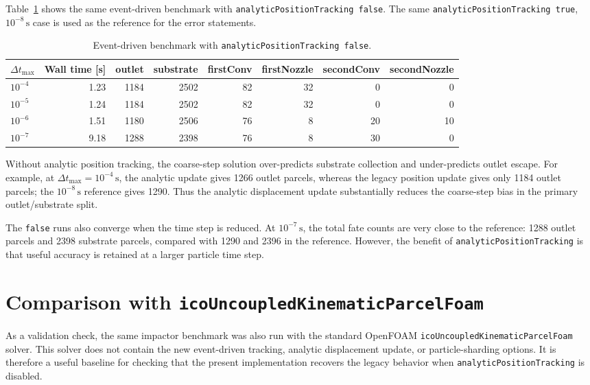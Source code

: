 \documentclass[11pt]{article}
\begin{document}
Table~\ref{tab:false-event} shows the same event-driven benchmark with
\texttt{analyticPositionTracking false}.  The same
\texttt{analyticPositionTracking true}, \(10^{-8}\,\mathrm{s}\) case is used as
the reference for the error statements.

\begin{table}[h]
\centering
\caption{Event-driven benchmark with \texttt{analyticPositionTracking false}.}
\label{tab:false-event}
\begin{tabular}{@{}lrrrrrrr@{}}
\toprule
\(\Delta t_{\max}\) & Wall time [s] & outlet & substrate & firstConv & firstNozzle & secondConv & secondNozzle \\
\midrule
\(10^{-4}\) & 1.23 & 1184 & 2502 & 82 & 32 & 0  & 0  \\
\(10^{-5}\) & 1.24 & 1184 & 2502 & 82 & 32 & 0  & 0  \\
\(10^{-6}\) & 1.51 & 1180 & 2506 & 76 & 8  & 20 & 10 \\
\(10^{-7}\) & 9.18 & 1288 & 2398 & 76 & 8  & 30 & 0  \\
\bottomrule
\end{tabular}
\end{table}

Without analytic position tracking, the coarse-step solution over-predicts
substrate collection and under-predicts outlet escape.  For example, at
\(\Delta t_{\max}=10^{-4}\,\mathrm{s}\), the analytic update gives
1266 outlet parcels, whereas the legacy position update gives only 1184 outlet
parcels; the \(10^{-8}\,\mathrm{s}\) reference gives 1290.  Thus the analytic
displacement update substantially reduces the coarse-step bias in the primary
outlet/substrate split.

The \texttt{false} runs also converge when the time step is reduced.  At
\(10^{-7}\,\mathrm{s}\), the total fate counts are very close to the reference:
1288 outlet parcels and 2398 substrate parcels, compared with 1290 and 2396 in
the reference.  However, the benefit of \texttt{analyticPositionTracking} is
that useful accuracy is retained at a larger particle time step.

\section{Comparison with \texttt{icoUncoupledKinematicParcelFoam}}

As a validation check, the same impactor benchmark was also run with the
standard OpenFOAM \texttt{icoUncoupledKinematicParcelFoam} solver.  This solver
does not contain the new event-driven tracking, analytic displacement update, or
particle-sharding options.  It is therefore a useful baseline for checking that
the present implementation recovers the legacy behavior when
\texttt{analyticPositionTracking} is disabled.
\end{document}
